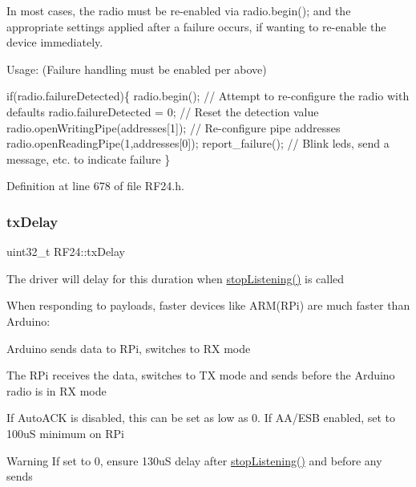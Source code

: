In most cases, the radio must be re-\/enabled via radio.\+begin(); and the appropriate settings applied after a failure occurs, if wanting to re-\/enable the device immediately.

Usage\+: (Failure handling must be enabled per above) 
\begin{DoxyCode}
\textcolor{keywordflow}{if}(radio.failureDetected)\{ 
  radio.begin();                       \textcolor{comment}{// Attempt to re-configure the radio with defaults}
  radio.failureDetected = 0;           \textcolor{comment}{// Reset the detection value}
  radio.openWritingPipe(addresses[1]); \textcolor{comment}{// Re-configure pipe addresses}
  radio.openReadingPipe(1,addresses[0]);
  report\_failure();                    \textcolor{comment}{// Blink leds, send a message, etc. to indicate failure}
\}
\end{DoxyCode}
 

Definition at line 678 of file R\+F24.\+h.

\mbox{\label{classRF24_a958fb99f54415101ca008ab11b3bfe79}} 
\subsubsection{\texorpdfstring{tx\+Delay}{txDelay}}
{\footnotesize\ttfamily uint32\+\_\+t R\+F24\+::tx\+Delay}

The driver will delay for this duration when \hyperlink{classRF24_a6f144d73fc447c8ac2d1a4166210fd88}{stop\+Listening()} is called

When responding to payloads, faster devices like A\+R\+M(\+R\+Pi) are much faster than Arduino\+:
\begin{DoxyEnumerate}
\item Arduino sends data to R\+Pi, switches to RX mode
\item The R\+Pi receives the data, switches to TX mode and sends before the Arduino radio is in RX mode
\item If Auto\+A\+CK is disabled, this can be set as low as 0. If A\+A/\+E\+SB enabled, set to 100uS minimum on R\+Pi
\end{DoxyEnumerate}

\begin{DoxyWarning}{Warning}
If set to 0, ensure 130uS delay after \hyperlink{classRF24_a6f144d73fc447c8ac2d1a4166210fd88}{stop\+Listening()} and before any sends 
\end{DoxyWarning}


